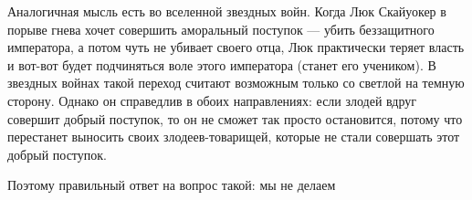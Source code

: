 \documentclass[a4paper,12pt]{article}
\begin{document}
Аналогичная мысль есть во вселенной звездных войн. Когда Люк Скайуокер в порыве гнева хочет совершить аморальный поступок --- убить беззащитного императора, а потом чуть не убивает своего отца, Люк практически теряет власть и вот-вот будет подчиняться воле этого императора (станет его учеником). В звездных войнах такой переход считают возможным только со светлой на темную сторону. Однако он справедлив в обоих направлениях: если злодей вдруг совершит добрый поступок, то он не сможет так просто остановится, потому что перестанет выносить своих злодеев-товарищей, которые не стали совершать этот добрый поступок.

Поэтому правильный ответ на вопрос такой: мы не делаем
\end{document}

